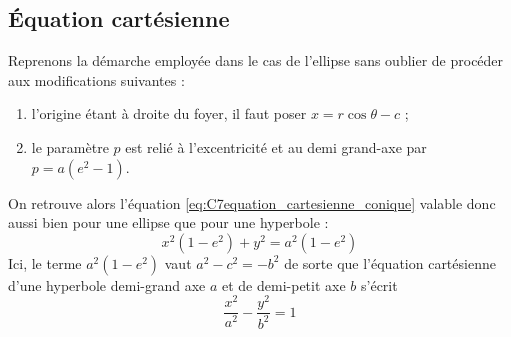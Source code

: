 \subsection{Équation cartésienne}
Reprenons la démarche employée dans le cas de l'ellipse sans oublier de procéder aux modifications suivantes :
\begin{enumerate}
	\item l'origine étant à droite du foyer, il faut poser $x=r\cos\theta-c$ ;
	\item le paramètre $p$ est relié à l'excentricité et au demi grand-axe par $p=a(e^2-1)$.
\end{enumerate}
On retrouve alors l'équation \eqref{eq:C7equation_cartesienne_conique} valable donc aussi bien pour une ellipse que pour une hyperbole :
\[	
x^2(1-e^2)+y^2=a^2(1-e^2)
\]
Ici, le terme $a^2(1-e^2)$ vaut $a^2-c^2=-b^2$ de sorte que l'équation cartésienne d'une hyperbole demi-grand axe $a$ et de demi-petit axe $b$ s'écrit 
\begin{equation}
\boxed{
\frac{x^{2}}{a^{2}}-\frac{y^{2}}{b^{2}}=1
}
\label{eq:C7equation_cartesienne_hyperbole}
\end{equation}



